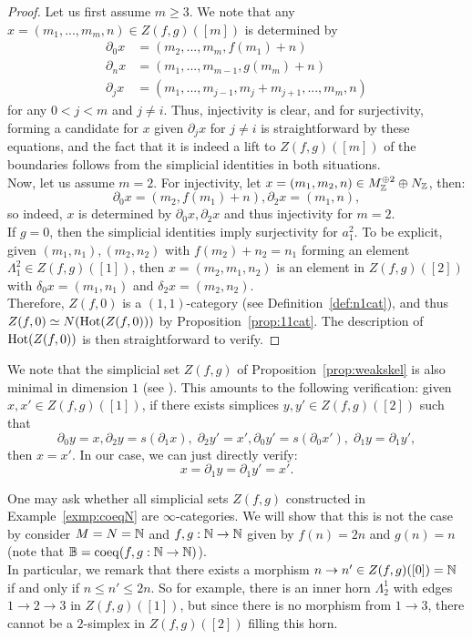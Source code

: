 \begin{proof}
Let us first assume $m\ge 3$. We note that any $x=(m_1,...,m_m, n) \in Z(f,g)([m])$ is determined by 
\begin{align*}
\partial_0 x &= (m_2,...,m_m, f(m_1)+n)\\
\partial_n x &= (m_1,...,m_{m-1}, g(m_m)+n)\\
\partial_j x &= (m_1,...,m_{j-1}, m_j + m_{j+1},...,m_m, n)
\end{align*}
for any $0 < j < m$ and $j \neq i$. Thus, injectivity is clear, and for surjectivity, forming a candidate for $x$ given 
$\partial_j x$ for $j \neq i$ is straightforward by these equations, and the fact that it is indeed a lift to $Z(f,g)([m])$ of the boundaries
follows from the simplicial identities in both situations. \\
\indent Now, let us assume $m=2$. For injectivity, let $x=(m_1,m_2,n) \in M_{\mathbb{Z}}^{\oplus 2} \oplus N_{\mathbb{Z}}$, then:
\[\partial_0 x = (m_2,f(m_1)+n), \partial_2 x  = (m_1, n),\]
so indeed, $x$ is determined by $\partial_0 x, \partial_2 x$ and thus injectivity for $m=2$.\\
\indent If $g=0$, then the simplicial identities imply surjectivity for $a^2_1$. To be explicit, given $(m_1,n_1), (m_2,n_2)$ 
with $f(m_2)+n_2=n_1$ forming an element $\Lambda^2_1 \in Z(f,g)([1])$, then $x=(m_2,m_1,n_2)$ is an element in $Z(f,g)([2])$ with
$\delta_0x=(m_1,n_1)$ and $\delta_2x=(m_2,n_2)$.\\
\indent Therefore, $Z(f,0)$ is a $(1,1)$-category (see Definition~\ref{def:n1cat}), and thus $Z(f,0) \simeq N(\operatorname{Hot}(Z(f,0)))$ by Proposition~\ref{prop:11cat}. 
The description of $\operatorname{Hot}(Z(f,0))$ is then straightforward to verify.
\end{proof}
\begin{remark}\label{rem:mindim1}
We note that the simplicial set $Z(f,g)$ of Proposition~\ref{prop:weakskel} is also minimal in dimension $1$ (see \cite[Definition 4.7.6.4]{keradon}). 
This amounts to the following verification: given $x,x' \in Z(f,g)([1])$, if there exists simplices $y,y' \in Z(f,g)([2])$ such that
\[\partial_0 y =x, \partial_2 y = s(\partial_1 x), \; \partial_2 y' =x', \partial_0 y' = s(\partial_0 x'), \; \partial_1 y = \partial_1 y',\]
then $x=x'$. In our case, we can just directly verify:
\[x=\partial_1 y = \partial_1 y' = x'.\]
\end{remark}
\begin{example}\label{exmp:notquasi}
One may ask whether all simplicial sets $Z(f,g)$ constructed in Example~\ref{exmp:coeqN} are $\infty$-categories. 
We will show that this is not the case by consider $M=N=\mathbb{N}$ and $f,g: \mathbb{N} \rightarrow \mathbb{N}$ given by $f(n)=2n$ and $g(n)=n$ (note that $\mathbb{B}= \operatorname{coeq}(f,g: \mathbb{N}\rightarrow \mathbb{N})$).\\
\indent In particular, we remark that there exists a morphism $n \rightarrow n' \in Z(f,g)([0])=\mathbb{N}$ if and only if $n \le n' \le 2n$. 
So for example, there is an inner horn $\Lambda^1_2$ with edges $ 1 \to 2 \to 3$ in $Z(f,g)([1])$, but since there is no morphism from $1 \to 3$, 
there cannot be a $2$-simplex in $Z(f,g)([2])$ filling this horn.
\end{example}
